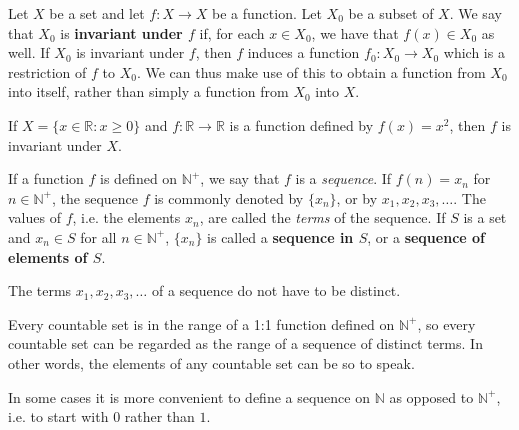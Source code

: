 \documentclass[12pt]{article}
\begin{document}
\begin{defn}
  Let $X$ be a set and let $f: X \to X$ be a function. Let $X_0$ be a subset of $X$.
  We say that $X_0$ is \textbf{invariant under $f$} if, for each $x \in X_0$, we have
  that $f(x) \in X_0$ as well. If $X_0$ is invariant under $f$, then $f$ induces a
  function $f_0: X_0 \to X_0$ which is a restriction of $f$ to $X_0$. We can thus
  make use of this to obtain a function from $X_0$ into itself, rather than simply a
  function from $X_0$ into $X$.
\end{defn}

\begin{exm}
  If $X = \{x \in \mathbb{R}: x \geq 0\}$ and $f: \mathbb{R} \to \mathbb{R}$ is a
  function defined by $f(x) = x^2$, then $f$ is invariant under $X$.
\end{exm}

\begin{defn}
  If a function $f$ is defined on $\mathbb{N}^+$, we say that $f$ is a
  \textit{sequence}. If $f(n) = x_n$ for $n \in \mathbb{N}^+$, the sequence $f$ is
  commonly denoted by $\{x_n\}$, or by $x_1,x_2,x_3,\ldots$. The values of $f$, i.e.
  the elements $x_n$, are called the \textit{terms} of the sequence. If $S$ is a set
  and $x_n \in S$ for all $n \in \mathbb{N}^+$, $\{x_n\}$ is called a
  \textbf{sequence in $S$}, or a \textbf{sequence of elements of $S$}.
\end{defn}

\begin{comm}
  The terms $x_1,x_2,x_3,\ldots$ of a sequence do not have to be distinct.
\end{comm}

\begin{comm}
  Every countable set is in the range of a 1:1 function defined on $\mathbb{N}^+$, so
  every countable set can be regarded as the range of a sequence of distinct terms.
  In other words, the elements of any countable set can be  so to speak.
\end{comm}

\begin{comm}
  In some cases it is more convenient to define a sequence on $\mathbb{N}$ as opposed
  to $\mathbb{N}^+$, i.e. to start with $0$ rather than $1$.
\end{comm}
\end{document}
